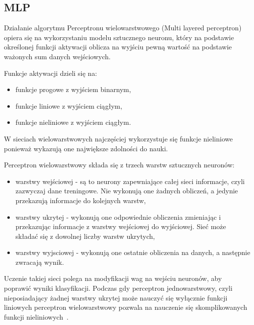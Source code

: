 \subsection{MLP}

Działanie algorytmu Perceptronu wielowarstwowego (Multi layered perceptron) 
opiera się na wykorzystaniu modelu sztucznego neuronu, który na podstawie określonej
funkcji aktywacji oblicza na wyjściu pewną wartość na podstawie ważonych sum danych
wejściowych. 

Funkcje aktywacji dzieli się na:
\begin{itemize}
    \item funkcje progowe z wyjściem binarnym,
    \item funkcje liniowe z wyjściem ciągłym,
    \item funkcje nieliniowe z wyjściem ciągłym.
\end{itemize}
W sieciach wielowarstwowych najczęściej wykorzystuje się funkcje nieliniowe ponieważ 
wykazują one największe zdolności do nauki.

Perceptron wielowarstwowy składa się z trzech warstw sztucznych neuronów: 
\begin{itemize}
    \item warstwy wejściowej - są to neurony zapewniające całej sieci
    informacje, czyli zazwyczaj dane treningowe. Nie wykonują one żadnych obliczeń,
    a jedynie przekazują informacje do kolejnych warstw,
    \item warstwy ukrytej - wykonują one odpowiednie obliczenia zmieniając 
    i przekazując informacje z warstwy wejściowej do wyjściowej. Sieć może składać
    się z dowolnej liczby warstw ukrytych,
    \item warstwy wyjsciowej - wykonują one ostatnie obliczenia na danych, 
    a następnie zwracają wynik.
\end{itemize}

Uczenie takiej sieci polega na modyfikacji wag na wejściu neuronów, aby poprawić
wyniki klasyfikacji. Podczas gdy perceptron jednowarstwowy, czyli nieposiadający żadnej warstwy ukrytej może 
nauczyć się wyłącznie funkcji liniowych perceptron wielowarstwowy pozwala na nauczenie
się skomplikowanych funkcji nieliniowych~\cite{MLAlgorithms}.

